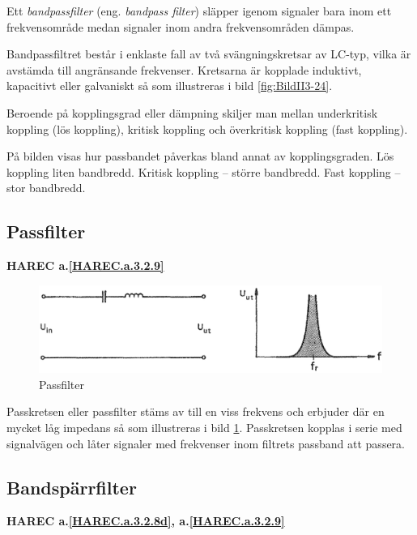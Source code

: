 Ett \emph{bandpassfilter} (eng. \emph{bandpass filter}) släpper igenom signaler
bara inom ett frekvensområde medan signaler inom andra frekvensområden dämpas.

Bandpassfiltret består i enklaste fall av två svängningskretsar av LC-typ, vilka
är avstämda till angränsande frekvenser. Kretsarna är kopplade induktivt,
kapacitivt eller galvaniskt så som illustreras i bild \ref{fig:BildII3-24}.

Beroende på kopplingsgrad eller dämpning skiljer man mellan underkritisk
koppling (lös koppling), kritisk koppling och överkritisk koppling
(fast koppling).

På bilden visas hur passbandet påverkas bland annat av kopplingsgraden.
Lös koppling liten bandbredd.
Kritisk koppling -- större bandbredd.
Fast koppling -- stor bandbredd.

\subsection{Passfilter}
\textbf{HAREC
  a.\ref{HAREC.a.3.2.9}\label{myHAREC.a.3.2.9d}
}

\begin{figure}
\includegraphics[width=\textwidth]{images/cropped_pdfs/bild_2_3-25.pdf}
\caption{Passfilter}
\label{fig:BildII3-25}
\end{figure}


Passkretsen eller passfilter stäms av till en viss frekvens och erbjuder där
en mycket låg impedans så som illustreras i bild \ref{fig:BildII3-25}.
Passkretsen kopplas i serie med signalvägen och låter signaler med
frekvenser inom filtrets passband att passera.

\subsection{Bandspärrfilter}
\textbf{HAREC
  a.\ref{HAREC.a.3.2.8d}\label{myHAREC.a.3.2.8d},
  a.\ref{HAREC.a.3.2.9}\label{myHAREC.a.3.2.9e}
}

